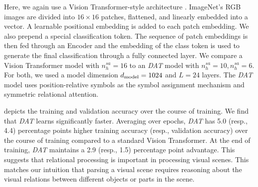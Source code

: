Here, we again use a Vision Transformer-style architecture \citep{dosovitskiyImageWorth16x162020}. ImageNet's RGB images are divided into $16 \times 16$ patches, flattened, and linearly embedded into a vector. A learnable positional embedding is added to each patch embedding. We also prepend a special classification token. The sequence of patch embeddings is then fed through an Encoder and the embedding of the class token is used to generate the final classification through a fully connected layer. We compare a Vision Transformer model with $n_h^{sa} = 16$ to an \textit{DAT} model with $n_h^{sa} = 10, n_h^{sa} = 6$. For both, we used a model dimension $d_{\mathrm{model}} = 1024$ and $L = 24$ layers. The \textit{DAT} model uses position-relative symbols as the symbol assignment mechanism and symmetric relational attention.

 depicts the training and validation accuracy over the course of training. We find that \textit{DAT} learns significantly faster. Averaging over epochs, \textit{DAT} has 5.0 (resp., 4.4) percentage points higher training accuracy (resp., validation accuracy) over the course of training compared to a standard Vision Transformer. At the end of training, \textit{DAT} maintains a 2.9 (resp., 1.5) percentage point advantage. This suggests that relational processing is important in processing visual scenes. This matches our intuition that parsing a visual scene requires reasoning about the visual relations between different objects or parts in the scene.

